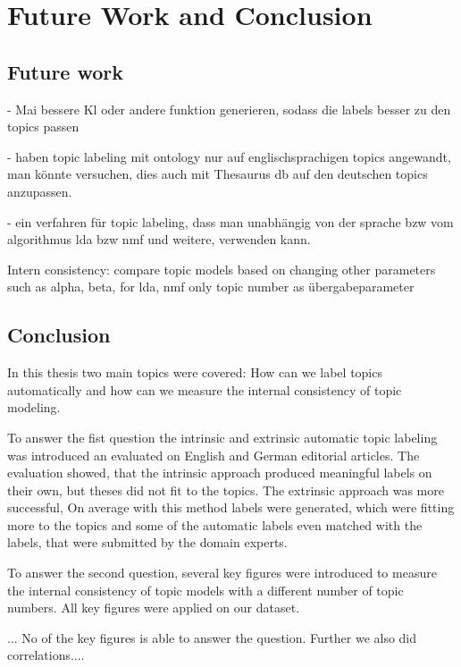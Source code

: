 \chapter{Future Work and Conclusion}
\label{future_work}

\section{Future work}
- Mai bessere Kl oder andere funktion generieren, sodass die labels besser zu den topics passen

- haben topic labeling mit ontology nur auf englischsprachigen topics angewandt, man könnte versuchen, dies  auch mit Thesaurus db auf den deutschen topics anzupassen.

- ein verfahren für topic labeling, dass man unabhängig von der sprache bzw vom algorithmus lda bzw nmf und weitere, verwenden kann. 

Intern consistency: compare topic models based on changing other parameters such as alpha, beta, for lda, nmf only topic number as übergabeparameter

\section{Conclusion}
In this thesis two main topics were covered: How can we label topics automatically and how can we measure the internal consistency of topic modeling. 

To answer the fist question the intrinsic and extrinsic automatic topic labeling was introduced an evaluated on English and German editorial articles. The evaluation showed, that the intrinsic approach produced meaningful labels on their own, but theses did not fit to the topics. The extrinsic approach was more successful,
On average with this method labels were generated, which were fitting more to the topics and some of the automatic labels even matched with the labels, that were submitted by the domain experts. 

To answer the second question, several key figures were introduced to measure the internal consistency of topic models with a different number of topic numbers. All key figures were applied on our dataset. 

...
No of the key figures is able to answer the question. Further we also did correlations....
